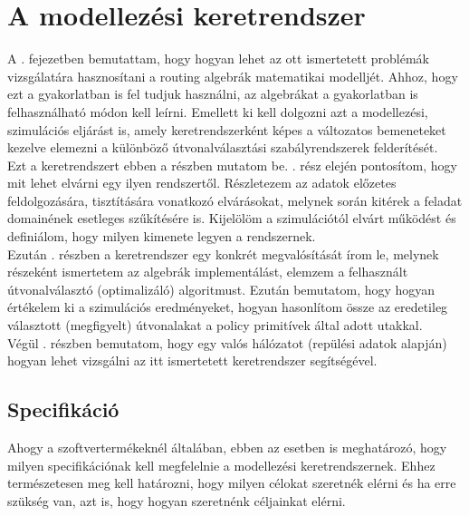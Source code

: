 \chapter{A modellezési keretrendszer}\label{framework}
A . fejezetben bemutattam, hogy hogyan lehet az ott ismertetett problémák vizsgálatára hasznosítani a routing algebrák matematikai modelljét. Ahhoz, hogy ezt a gyakorlatban is fel tudjuk használni, az algebrákat a gyakorlatban is felhasználható módon kell leírni. Emellett ki kell dolgozni azt a modellezési, szimulációs eljárást is, amely keretrendszerként képes a változatos bemeneteket kezelve elemezni a különböző útvonalválasztási szabályrendszerek felderítését.\\

Ezt a keretrendszert ebben a részben mutatom be. . rész elején pontosítom, hogy mit lehet elvárni egy ilyen rendszertől. Részletezem az adatok előzetes feldolgozására, tisztítására vonatkozó elvárásokat, melynek során kitérek a feladat domainének esetleges szűkítésére is. Kijelölöm a szimulációtól elvárt működést és definiálom, hogy milyen kimenete legyen a rendszernek.\\
Ezután . részben a keretrendszer egy konkrét megvalósítását írom le, melynek részeként ismertetem az algebrák implementálást, elemzem a felhasznált útvonalválasztó (optimalizáló) algoritmust. Ezután bemutatom, hogy hogyan értékelem ki a szimulációs eredményeket, hogyan hasonlítom össze az eredetileg választott (megfigyelt) útvonalakat a policy primitívek által adott utakkal.\\
Végül . részben bemutatom, hogy egy valós hálózatot (repülési adatok alapján) hogyan lehet vizsgálni az itt ismertetett keretrendszer segítségével.

  \section{Specifikáció}\label{section_specification}
  Ahogy a szoftvertermékeknél általában, ebben az esetben is meghatározó, hogy milyen specifikációnak kell megfelelnie a modellezési keretrendszernek. Ehhez természetesen meg kell határozni, hogy milyen célokat szeretnék elérni és ha erre szükség van, azt is, hogy hogyan szeretnénk céljainkat elérni.\\

